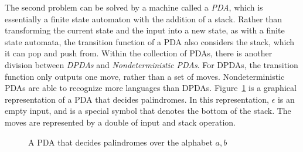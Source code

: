 \documentclass[psamsfonts]{amsart}
\theoremstyle{definition}
\theoremstyle{remark}
\numberwithin{equation}{section}
\begin{document}
The second problem can be solved by a machine called a \emph{\ac{PDA}}, which is essentially a finite state automaton with the addition of
a stack. Rather than transforming the current state and the input into a new
state, as with a finite state automata, the transition function of a \ac{PDA} also considers the stack, which it can pop and push from. Within the
collection of \acp{PDA}, there is another division between
\emph{\acp{DPDA}} and \emph{Nondeterministic \aclp{PDA}}. For \acp{DPDA}, the
transition function only outputs one move, rather than a set of
moves. Nondeterministic \acp{PDA} are able to recognize more languages than
\acp{DPDA}. Figure~\ref{fig:pda} is a graphical representation of a \ac{PDA}
that decides palindromes. In this representation, $\epsilon$ is an empty input,
and  is a special symbol that denotes the bottom of the stack. The moves are
represented by a double of input and stack operation.

\begin{figure}[h]
  \label{fig:pda}
  \caption{A \acl{PDA} that decides palindromes over the alphabet ${a,b}$}
\end{figure}
\end{document}
